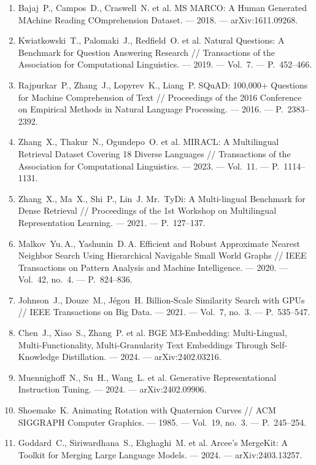 \documentclass[12pt,a4paper]{article}
\begin{document}
\begin{enumerate}
  \item\label{ref:msmarco} Bajaj~P., Campos~D., Craswell~N. et al. MS MARCO: A Human Generated MAchine Reading COmprehension Dataset. --- 2018. --- arXiv:1611.09268.
  \item\label{ref:nq} Kwiatkowski~T., Palomaki~J., Redfield~O. et al. Natural Questions: A Benchmark for Question Answering Research // Transactions of the Association for Computational Linguistics. --- 2019. --- Vol.~7. --- P.~452--466.
  \item\label{ref:squad} Rajpurkar~P., Zhang~J., Lopyrev~K., Liang~P. SQuAD: 100,000+ Questions for Machine Comprehension of Text // Proceedings of the 2016 Conference on Empirical Methods in Natural Language Processing. --- 2016. --- P.~2383--2392.
  \item\label{ref:miracl} Zhang~X., Thakur~N., Ogundepo~O. et al. MIRACL: A Multilingual Retrieval Dataset Covering 18 Diverse Languages // Transactions of the Association for Computational Linguistics. --- 2023. --- Vol.~11. --- P.~1114--1131.
  \item\label{ref:mrtydi} Zhang~X., Ma~X., Shi~P., Lin~J. Mr.~TyDi: A Multi-lingual Benchmark for Dense Retrieval // Proceedings of the 1st Workshop on Multilingual Representation Learning. --- 2021. --- P.~127--137.
  \item\label{ref:hnsw} Malkov~Yu.\,A., Yashunin~D.\,A. Efficient and Robust Approximate Nearest Neighbor Search Using Hierarchical Navigable Small World Graphs // IEEE Transactions on Pattern Analysis and Machine Intelligence. --- 2020. --- Vol.~42, no.~4. --- P.~824--836.
  \item\label{ref:faiss} Johnson~J., Douze~M., J\'egou~H. Billion-Scale Similarity Search with GPUs // IEEE Transactions on Big Data. --- 2021. --- Vol.~7, no.~3. --- P.~535--547.
  \item\label{ref:bgem3} Chen~J., Xiao~S., Zhang~P. et al. BGE M3-Embedding: Multi-Lingual, Multi-Functionality, Multi-Granularity Text Embeddings Through Self-Knowledge Distillation. --- 2024. --- arXiv:2402.03216.
  \item\label{ref:gritlm} Muennighoff~N., Su~H., Wang~L. et al. Generative Representational Instruction Tuning. --- 2024. --- arXiv:2402.09906.
  \item\label{ref:slerp} Shoemake~K. Animating Rotation with Quaternion Curves // ACM SIGGRAPH Computer Graphics. --- 1985. --- Vol.~19, no.~3. --- P.~245--254.
  \item\label{ref:mergekit} Goddard~C., Siriwardhana~S., Ehghaghi~M. et al. Arcee's MergeKit: A Toolkit for Merging Large Language Models. --- 2024. --- arXiv:2403.13257.
\end{enumerate}
\end{document}
